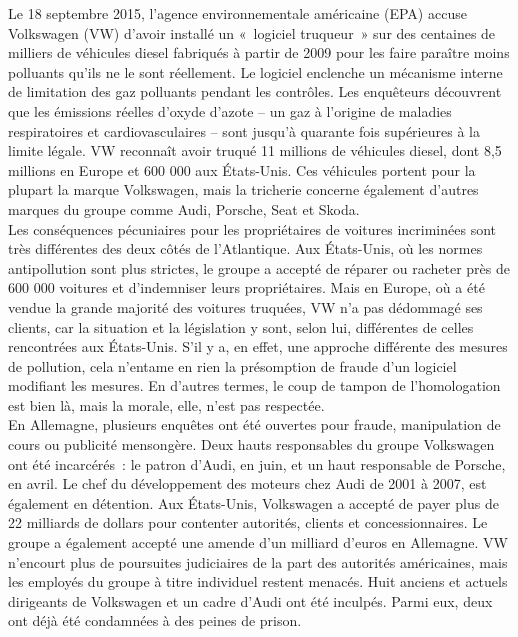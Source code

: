 \documentclass[8pt]{article}
\begin{document}
Le 18 septembre 2015, l'agence environnementale américaine (EPA) accuse Volkswagen (VW) d'avoir installé un «~logiciel truqueur~» sur des centaines de milliers de véhicules diesel fabriqués à partir de 2009 pour les faire paraître moins polluants qu'ils ne le sont réellement.
Le logiciel enclenche un mécanisme interne de limitation des gaz polluants pendant les contrôles. Les enquêteurs découvrent que les émissions réelles d'oxyde d'azote – un gaz à l'origine de maladies respiratoires et cardiovasculaires – sont jusqu'à quarante fois supérieures à la limite légale.
VW reconnaît avoir truqué 11 millions de véhicules diesel, dont 8,5 millions en Europe et 600 000 aux États-Unis. Ces véhicules portent pour la plupart la marque Volkswagen, mais la tricherie concerne également d'autres marques du groupe comme Audi, Porsche, Seat et Skoda.\\

Les conséquences pécuniaires pour les propriétaires de voitures incriminées sont très différentes des deux côtés de l'Atlantique. Aux États-Unis, où les normes antipollution sont plus strictes, le groupe a accepté de réparer ou racheter près de 600 000 voitures et d'indemniser leurs propriétaires.
Mais en Europe, où a été vendue la grande majorité des voitures truquées, VW n'a pas dédommagé ses clients, car la situation et la législation y sont, selon lui, différentes de celles rencontrées aux États-Unis. S'il y a, en effet, une approche différente des mesures de pollution, cela n'entame en rien la présomption de fraude d'un logiciel modifiant les mesures. En d'autres termes, le coup de tampon de l'homologation est bien là, mais la morale, elle, n'est pas respectée.\\

En Allemagne, plusieurs enquêtes ont été ouvertes pour fraude, manipulation de cours ou publicité mensongère. Deux hauts responsables du groupe Volkswagen ont été incarcérés~: le patron d'Audi, en juin, et un haut responsable de Porsche, en avril. Le chef du développement des moteurs chez Audi de 2001 à 2007, est également en détention. Aux États-Unis, Volkswagen a accepté de payer plus de 22 milliards de dollars pour contenter autorités, clients et concessionnaires. Le groupe a également accepté une amende d'un milliard d'euros en Allemagne.
VW n'encourt plus de poursuites judiciaires de la part des autorités américaines, mais les employés du groupe à titre individuel restent menacés. Huit anciens et actuels dirigeants de Volkswagen et un cadre d'Audi ont été inculpés. Parmi eux, deux ont déjà été condamnées à des peines de prison.\\
\end{document}
